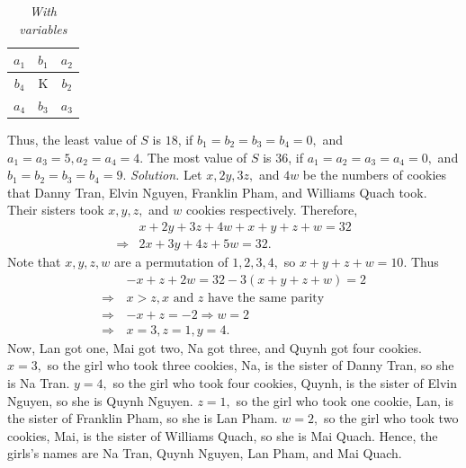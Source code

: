 \begin{multicols}{2}
\begin{table}[H]
\begin{tabular}{|c|c|c|}
					\hline
					$a_1$ & $b_1$ & $a_2$ \\ \hline
					$b_4$ & K & $b_2$ \\ \hline
					$a_4$ & $b_3$ & $a_3$ \\ \hline
				\end{tabular}
				\caption{\small\textit{\color{toancuabi}With variables}}
				\vspace*{-10pt}
			\end{table}
			Thus, the least value of $S$ is $18$, if $b_1=b_2=b_3=b_4=0,$ and $a_1=a_3=5,a_2=a_4=4.$
			The most value of $S$ is $36$, if $a_1=a_2=a_3=a_4=0,$ and $b_1=b_2=b_3=b_4=9.$
		\vskip 0.2cm
		\vskip 0.2cm
		\textit{Solution.}
			Let $x, 2y, 3z,$ and $4w$ be the numbers of cookies that 
			Danny Tran, Elvin Nguyen, Franklin Pham, and Williams Quach took.
			Their sisters took $x, y, z,$ and $w$ cookies respectively. Therefore,
			\begin{align*}
				&x + 2y + 3z + 4w + x + y + z + w = 32\\
				\Rightarrow &2x + 3y + 4z + 5w = 32.
			\end{align*}
			Note that $x, y, z, w$ are a permutation of $1,2,3,4,$ so $x + y + z + w = 10.$
			Thus 
			\begin{align*}
				&-x + z + 2w \!=\! 32-3(x + y + z + w) \!=\! 2 \\
				\Rightarrow \,&x > z, x \text{\ and\ } z \text{\ have the same parity}\\
				\Rightarrow\,&-x+z=-2 \Rightarrow  w=2 \\
				\Rightarrow \,&x=3, z=1, y=4. 
			\end{align*}
			Now, Lan got one, Mai got two, Na got three, and Quynh got four cookies.
			\vskip 0.1cm
			$x=3,$ so the girl who took three cookies, Na, is the sister of Danny Tran, so she is Na Tran.
			\vskip 0.1cm
			$y=4,$ so the girl who took four cookies, Quynh, is the sister of Elvin Nguyen, so she is Quynh Nguyen.
			\vskip 0.1cm
			$z=1,$ so the girl who took one cookie, Lan, is the sister of Franklin Pham, so she is Lan Pham.
			\vskip 0.1cm
			$w=2,$ so the girl who took two cookies, Mai, is the sister of Williams Quach, so she is Mai Quach.
			\vskip 0.1cm
			Hence, the girls's names are Na Tran, Quynh Nguyen, Lan Pham, and Mai Quach.
\end{multicols}
	